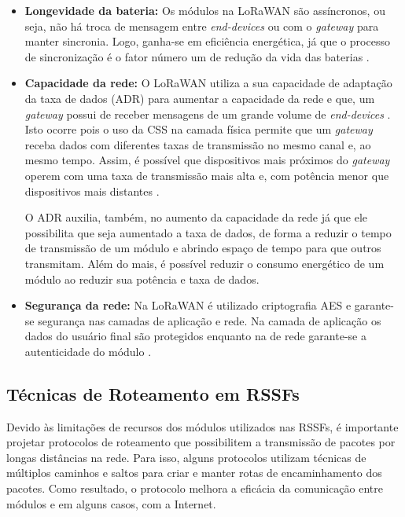 \begin{itemize}
  \item \textbf{Longevidade da bateria:} Os módulos na LoRaWAN são assíncronos, ou seja, não há troca de mensagem entre \textit{end-devices} ou com o \textit{gateway} para manter sincronia. Logo, ganha-se em eficiência energética, já que o processo de sincronização é o fator número um de redução da vida das baterias \cite{loraAllianceWhatIs}.
  
  \item \textbf{Capacidade da rede:} O LoRaWAN utiliza a sua capacidade de adaptação da taxa de dados (\ac{ADR}) para aumentar a capacidade da rede e que, um \textit{gateway} possui de receber mensagens de um grande volume de \textit{end-devices} \cite{loraAllianceWhatIs}. Isto ocorre pois o uso da \ac{CSS} na camada física permite que um \textit{gateway} receba dados com diferentes taxas de transmissão no mesmo canal e, ao mesmo tempo. Assim, é possível que dispositivos mais próximos do \textit{gateway} operem com uma taxa de transmissão mais alta e, com potência menor que dispositivos mais distantes \cite{LEONAN}.
  
  O \ac{ADR} auxilia, também, no aumento da capacidade da rede já que ele possibilita que seja aumentado a taxa de dados, de forma a reduzir o tempo de transmissão de um módulo e abrindo espaço de tempo para que outros transmitam. Além do mais, é possível reduzir o consumo energético de um módulo ao reduzir sua potência e taxa de dados.
  
  \item \textbf{Segurança da rede:} Na LoRaWAN é utilizado criptografia \ac{AES} e garante-se segurança nas camadas de aplicação e rede. Na camada de aplicação os dados do usuário final são protegidos enquanto na de rede garante-se a autenticidade do módulo \cite{loraAllianceWhatIs}.
\end{itemize}


\subsection{Técnicas de Roteamento em \ac{RSSF}s} 
\label{s_c2_roteamento_RSSF}

Devido às limitações de recursos dos módulos utilizados nas \ac{RSSF}s, é importante projetar protocolos de roteamento que possibilitem a transmissão de pacotes por longas distâncias na rede. Para isso, alguns protocolos utilizam técnicas de múltiplos caminhos e saltos para criar e manter rotas de encaminhamento dos pacotes. Como resultado, o protocolo melhora a eficácia da comunicação entre módulos e em alguns casos, com a Internet.


